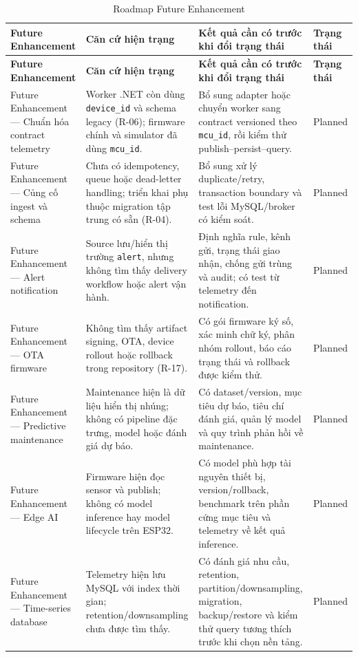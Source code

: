 \begin{longtable}{p{}p{}p{}p{}}
\caption{Roadmap Future Enhancement}\label{tab:future-enhancement-roadmap}\\
\hline
\textbf{Future Enhancement} & \textbf{Căn cứ hiện trạng} & \textbf{Kết quả cần có trước khi đổi trạng thái} & \textbf{Trạng thái} \\
\hline
\endfirsthead
\hline
\textbf{Future Enhancement} & \textbf{Căn cứ hiện trạng} & \textbf{Kết quả cần có trước khi đổi trạng thái} & \textbf{Trạng thái} \\
\hline
\endhead
Future Enhancement --- Chuẩn hóa contract telemetry & Worker .NET còn dùng \texttt{device\_id} và schema legacy (R-06); firmware chính và simulator đã dùng \texttt{mcu\_id}. & Bổ sung adapter hoặc chuyển worker sang contract versioned theo \texttt{mcu\_id}, rồi kiểm thử publish--persist--query. & Planned \\
Future Enhancement --- Củng cố ingest và schema & Chưa có idempotency, queue hoặc dead-letter handling; triển khai phụ thuộc migration tập trung có sẵn (R-04). & Bổ sung xử lý duplicate/retry, transaction boundary và test lỗi MySQL/broker có kiểm soát. & Planned \\
Future Enhancement --- Alert notification & Source lưu/hiển thị trường \texttt{alert}, nhưng không tìm thấy delivery workflow hoặc alert vận hành. & Định nghĩa rule, kênh gửi, trạng thái giao nhận, chống gửi trùng và audit; có test từ telemetry đến notification. & Planned \\
Future Enhancement --- OTA firmware & Không tìm thấy artifact signing, OTA, device rollout hoặc rollback trong repository (R-17). & Có gói firmware ký số, xác minh chữ ký, phân nhóm rollout, báo cáo trạng thái và rollback được kiểm thử. & Planned \\
Future Enhancement --- Predictive maintenance & Maintenance hiện là dữ liệu hiển thị nhúng; không có pipeline đặc trưng, model hoặc đánh giá dự báo. & Có dataset/version, mục tiêu dự báo, tiêu chí đánh giá, quản lý model và quy trình phản hồi về maintenance. & Planned \\
Future Enhancement --- Edge AI & Firmware hiện đọc sensor và publish; không có model inference hay model lifecycle trên ESP32. & Có model phù hợp tài nguyên thiết bị, version/rollback, benchmark trên phần cứng mục tiêu và telemetry về kết quả inference. & Planned \\
Future Enhancement --- Time-series database & Telemetry hiện lưu MySQL với index thời gian; retention/downsampling chưa được tìm thấy. & Có đánh giá nhu cầu, retention, partition/downsampling, migration, backup/restore và kiểm thử query tương thích trước khi chọn nền tảng. & Planned \\

\end{longtable}
